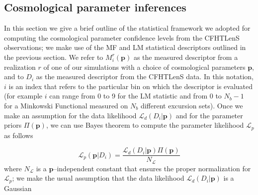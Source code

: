 \documentclass[reprint,aps,prd,superscriptaddress,showkeys,showpacs]{revtex4-1}
\begin{document}

\subsection{Cosmological parameter inferences}
\label{cosmostats}

In this section we give a brief outline of the statistical framework we adopted for computing the cosmological parameter confidence levels from the CFHTLenS observations; we make use of the MF and LM statistical descriptors outlined in the previous section. We refer to $M_i^r(\mathbf{p})$ as the measured descriptor from a realization $r$ of one of our simulations with a choice of cosmological parameters $\mathbf{p}$, and to $D_i$ as the measured descriptor from the CFHTLenS data. In this notation, $i$ is an index that refers to the particular bin on which the descriptor is evaluated (for example $i$ can range from 0 to 9 for the LM statistic and from 0 to $N_b-1$ for a Minkowski Functional measured on $N_b$ different excursion sets). Once we make an assumption for the data likelihood $\mathcal{L}_d(D_i\vert \mathbf{p})$ and for the parameter priors $\Pi(\mathbf{p})$, we can use Bayes theorem to compute the parameter likelihood $\mathcal{L}_p$ as follows

\begin{equation}
\label{parameterlikelihood}
\mathcal{L}_p(\mathbf{p}\vert D_i) = \frac{\mathcal{L}_d(D_i\vert \mathbf{p})\Pi(\mathbf{p})}{N_{\mathcal{L}}}
\end{equation}
%
where $N_{\mathcal{L}}$ is a $\mathbf{p}$--independent constant that ensures the proper normalization for $\mathcal{L}_p$; we make the usual assumption that the data likelihood $\mathcal{L}_d(D_i\vert \mathbf{p})$ is a Gaussian

\end{document}
